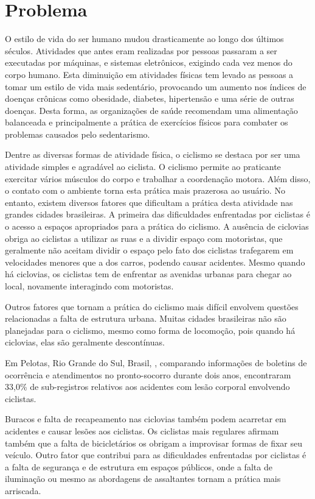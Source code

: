 \chapter[Problema]{Problema}

O estilo de vida do ser humano mudou drasticamente ao longo dos últimos séculos. Atividades que antes eram realizadas por pessoas passaram a ser executadas 
por máquinas, e sistemas eletrônicos, exigindo cada vez menos do corpo humano. Esta diminuição em atividades físicas tem levado as pessoas a tomar um estilo 
de vida mais sedentário, provocando um aumento nos índices de doenças crônicas como obesidade, diabetes, hipertensão e uma série de outras doenças. Desta forma, 
as organizações de saúde recomendam uma alimentação balanceada e principalmente a prática de exercícios físicos para combater os problemas causados pelo 
sedentarismo.

Dentre as diversas formas de atividade física, o ciclismo se destaca por ser uma atividade simples e agradável ao ciclista. O ciclismo permite ao praticante 
exercitar vários músculos do corpo e trabalhar a coordenação motora. Além disso, o contato com o ambiente torna esta prática mais prazerosa ao usuário. No 
entanto, existem diversos fatores que dificultam a prática desta atividade nas grandes cidades brasileiras.
A primeira das dificuldades enfrentadas por ciclistas é o acesso a espaços apropriados para a prática do ciclismo. A ausência de ciclovias obriga ao ciclistas 
a utilizar as ruas e a dividir espaço com motoristas, que geralmente não aceitam dividir o espaço pelo fato dos ciclistas trafegarem em velocidades menores que 
a dos carros, podendo causar acidentes. Mesmo quando há ciclovias, os ciclistas tem de enfrentar as avenidas urbanas para chegar ao local, novamente interagindo 
com motoristas.

Outros fatores que tornam a prática do ciclismo mais difícil envolvem questões relacionadas a falta de estrutura urbana. Muitas cidades brasileiras não são 
planejadas para o ciclismo, mesmo como forma de locomoção, pois quando há ciclovias, elas são geralmente descontínuas. 

Em Pelotas, Rio Grande do Sul, Brasil, \cite{barros2003}, comparando informações de boletins de ocorrência e atendimentos no pronto-socorro durante dois anos, encontraram 33,0\% de sub-registros relativos aos acidentes com lesão corporal envolvendo ciclistas.

Buracos e falta de recapeamento nas ciclovias também podem acarretar em acidentes e causar lesões aos ciclistas. Os ciclistas mais regulares afirmam também que a falta de bicicletários os obrigam a improvisar formas de fixar seu veículo. Outro fator que contribui para as dificuldades enfrentadas por ciclistas é a falta de segurança e de estrutura em espaços públicos, onde a falta de iluminação ou mesmo as abordagens de assaltantes tornam a prática mais arriscada.

